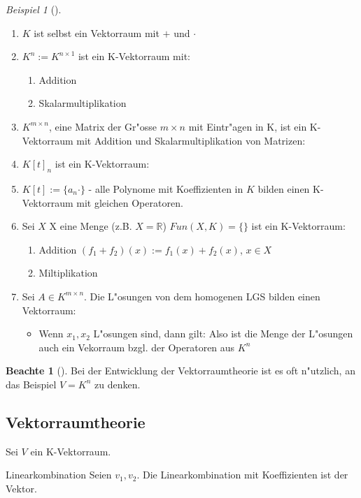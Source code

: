 \documentclass[11pt]{article}
\theoremstyle{remark}
\newtheorem{exa}{Beispiel}[section]
\theoremstyle{definition}
\newtheorem*{notte}{Beachte}
\theoremstyle{remark}
\begin{document}
\begin{exa}[] \label{}
\begin{enumerate}
\item \(K\) ist selbst ein Vektorraum mit \(+\) und \(\cdot\)
\item \(K^{n}:=K^{n\times 1}\) ist ein K-Vektorraum mit:
\begin{enumerate}
\item Addition
\item Skalarmultiplikation
\end{enumerate}
\item \(K^{m \times n}\), eine Matrix der Gr"osse \(m\times n\) mit Eintr"agen in K,
ist ein K-Vektorraum mit Addition und Skalarmultiplikation von Matrizen:
\item \(K[t]_n\) ist ein K-Vektorraum:
\item \(K[t]:=\{a_n\cdot \}\) - alle Polynome mit Koeffizienten in \(K\) bilden einen
K-Vektorraum mit gleichen Operatoren.
\item Sei \(X\) X eine Menge (z.B. \(X=\mathbb{R}\)) \(Fun(X,K)=\{\}\) ist ein K-Vektorraum:
\begin{enumerate}
\item Addition \((f_1 + f_2)(x):= f_1(x)+ f_2(x)\), \(x\in X\)
\item Miltiplikation
\end{enumerate}
\item Sei \(A\in K^{m\times n}\). Die L"osungen von dem homogenen LGS bilden einen
Vektorraum:
\begin{itemize}
\item Wenn \(x_1,x_2\) L"osungen sind, dann gilt: Also ist die Menge der
L"osungen auch ein Vekorraum bzgl. der Operatoren aus \(K^n\)
\end{itemize}
\end{enumerate}
\end{exa}

\begin{notte}[] \label{}
Bei der Entwicklung der Vektorraumtheorie ist es oft n"utzlich, an das Beispiel
\(V=K^n\) zu denken.
\end{notte}

\subsection{Vektorraumtheorie}
\label{sec:org432e282}
Sei \(V\) ein K-Vektorraum.

\begin{definition}{Linearkombination}{}
Seien \(v_1, v_2\). Die Linearkombination mit Koeffizienten ist der Vektor.
\end{definition}
\end{document}
